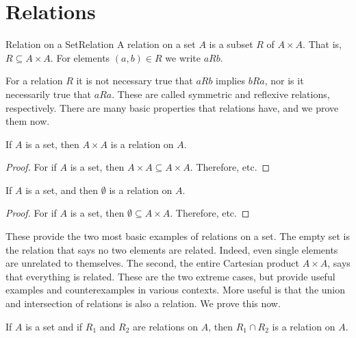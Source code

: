 \documentclass[crop=false,class=book,oneside]{standalone}                      %
\begin{document}
    \section{Relations}
        \begin{ldefinition}{Relation on a Set}{Relation}
            A relation on a set $A$ is a subset $R$ of $A\times{A}$.
            That is, $R\subseteq{A}\times{A}$. For elements
            $(a,b)\in{R}$ we write $aRb$.
        \end{ldefinition}
        For a relation $R$ it is not necessary true that $aRb$
        implies $bRa$, nor is it necessarily true that $aRa$. These
        are called symmetric and reflexive relations, respectively.
        There are many basic properties that relations have, and we
        prove them now.
        \begin{theorem}
            \label{thm:Cartesian_Product_Is_Relation}%
            If $A$ is a set, then $A\times{A}$ is a relation on $A$.
        \end{theorem}
        \begin{proof}
            For if $A$ is a set, then
            $A\times{A}\subseteq{A}\times{A}$. Therefore, etc.
        \end{proof}
        \begin{theorem}
            \label{thm:Empty_Set_Is_Relation}%
            If $A$ is a set, and then $\emptyset$ is a relation
            on $A$.
        \end{theorem}
        \begin{proof}
            For if $A$ is a set, then
            $\emptyset\subseteq{A}\times{A}$. Therefore, etc.
        \end{proof}
        These provide the two most basic examples of relations on a
        set. The empty set is the relation that says no two elements
        are related. Indeed, even single elements are unrelated to
        themselves. The second, the entire Cartesian product
        $A\times{A}$, says that everything is related. These are the
        two extreme cases, but provide useful examples and
        counterexamples in various contexts. More useful is that the
        union and intersection of relations is also a relation. We
        prove this now.
        \begin{theorem}
            \label{thm:Intersection_of_Relations_Is_Relation}%
            If $A$ is a set and if $R_{1}$ and $R_{2}$ are relations
            on $A$, then $R_{1}\cap{R}_{2}$ is a relation on $A$.
        \end{theorem}
\end{document}
